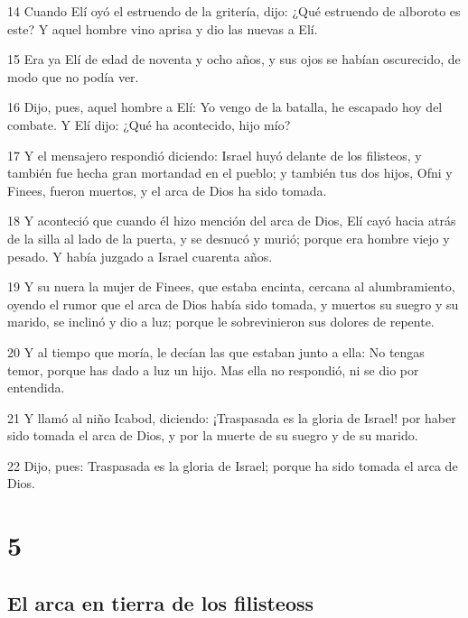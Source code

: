 \par 14 Cuando Elí oyó el estruendo de la gritería, dijo: ¿Qué estruendo de alboroto es este? Y aquel hombre vino aprisa y dio las nuevas a Elí.
\par 15 Era ya Elí de edad de noventa y ocho años, y sus ojos se habían oscurecido, de modo que no podía ver.
\par 16 Dijo, pues, aquel hombre a Elí: Yo vengo de la batalla, he escapado hoy del combate. Y Elí dijo: ¿Qué ha acontecido, hijo mío?
\par 17 Y el mensajero respondió diciendo: Israel huyó delante de los filisteos, y también fue hecha gran mortandad en el pueblo; y también tus dos hijos, Ofni y Finees, fueron muertos, y el arca de Dios ha sido tomada. 
\par 18 Y aconteció que cuando él hizo mención del arca de Dios, Elí cayó hacia atrás de la silla al lado de la puerta, y se desnucó y murió; porque era hombre viejo y pesado. Y había juzgado a Israel cuarenta años.
\par 19 Y su nuera la mujer de Finees, que estaba encinta, cercana al alumbramiento, oyendo el rumor que el arca de Dios había sido tomada, y muertos su suegro y su marido, se inclinó y dio a luz; porque le sobrevinieron sus dolores de repente.
\par 20 Y al tiempo que moría, le decían las que estaban junto a ella: No tengas temor, porque has dado a luz un hijo. Mas ella no respondió, ni se dio por entendida.
\par 21 Y llamó al niño Icabod, diciendo: ¡Traspasada es la gloria de Israel! por haber sido tomada el arca de Dios, y por la muerte de su suegro y de su marido.
\par 22 Dijo, pues: Traspasada es la gloria de Israel; porque ha sido tomada el arca de Dios.

\chapter{5}

\section*{El arca en tierra de los filisteoss}

